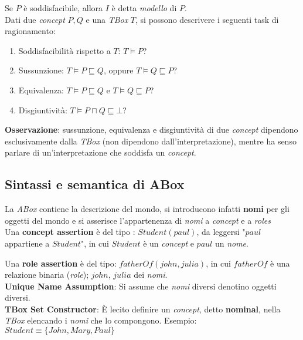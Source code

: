 Se $P$ è soddisfacibile, allora $I$ è detta \textit{modello} di $P$.
\\

Dati due \textit{concept} $P, Q$ e una \textit{TBox} $T$, si possono descrivere i seguenti task di ragionamento:
\begin{enumerate}
\item Soddisfacibilità rispetto a $T$: $T \models P$?
\item Sussunzione: $T \models P \sqsubseteq Q$, oppure $T \models Q \sqsubseteq P$?
\item Equivalenza: $T \models P \sqsubseteq Q$ e $T \models Q \sqsubseteq P$?
\item Disgiuntività: $T \models P \sqcap Q \sqsubseteq \bot$?
\end{enumerate}

\textbf{Osservazione}: sussunzione, equivalenza e disgiuntività di due \textit{concept} dipendono esclusivamente dalla \textit{TBox} (non dipendono dall'interpretazione), mentre ha senso parlare di un'interpretazione che soddisfa un \textit{concept}.

\subsection{Sintassi e semantica di ABox}
La \textit{ABox} contiene la descrizione del mondo, si introducono infatti \textbf{nomi} per gli oggetti del mondo e si asserisce l'appartenenza di \textit{nomi} a \textit{concept} e a \textit{roles}
\\

Una \textbf{concept assertion} è del tipo : $Student(paul)$, da leggersi "$paul$ appartiene a $Student$", in cui $Student$ è un \textit{concept} e $paul$ un \textit{nome}.

Una \textbf{role assertion} è del tipo: $fatherOf(john, julia)$, in cui $fatherOf$ è una relazione binaria (\textit{role}); $john$, $julia$ dei \textit{nomi}.
\\

\textbf{Unique Name Assumption}: Si assume che \textit{nomi} diversi denotino oggetti diversi.
\\

\textbf{TBox Set Constructor}: È lecito definire un \textit{concept}, detto \textbf{nominal}, nella \textit{TBox} elencando i \textit{nomi} che lo compongono. Esempio: $Student \equiv \lbrace John, Mary, Paul \rbrace$

